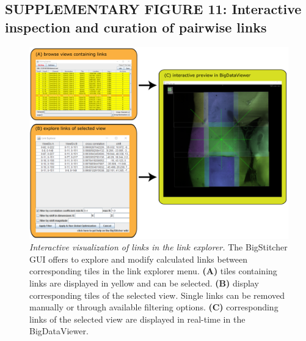 \documentclass[]{spie}  %
\begin{document}
\subsection*{SUPPLEMENTARY FIGURE 11: Interactive inspection and curation of pairwise links}
\vspace{1mm}
\begin{figure}[h!]
\includegraphics[width=\textwidth]{Supp-Link-Explorer.png}
\vspace{-2.0mm}
\caption{\hspace{-0.5mm} \emph{Interactive visualization of links in the link explorer.} The BigStitcher GUI offers to explore and modify calculated links between corresponding tiles in the link explorer menu. \textbf{(A)} tiles containing links are displayed in yellow and can be selected. \textbf{(B)} display corresponding tiles of the selected view. Single links can be removed manually or through available filtering options. \textbf{(C)} corresponding links of the selected view are displayed in real-time in the BigDataViewer.
}
\label{fig:sup-fig-link-explorer}
\end{figure}

\pagebreak
\end{document}
